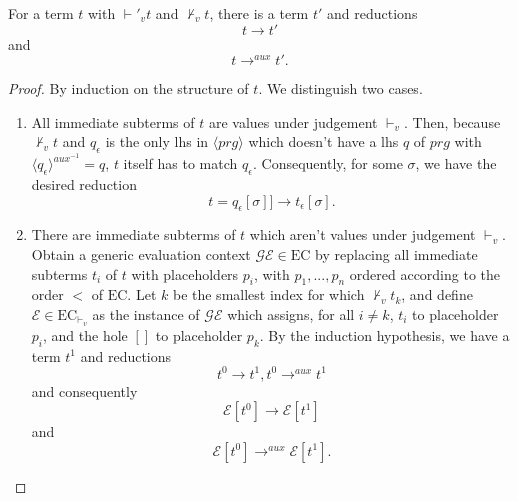 \begin{lemma}

For a term $t$ with $\vdash'_v t$ and $\not\vdash_v t$, there is a term $t'$ and reductions
\[
t \longrightarrow t'
\]
and
\[
t \longrightarrow^{aux} t'.
\]

\begin{proof}

By induction on the structure of $t$. We distinguish two cases.
\begin{enumerate}
\item All immediate subterms of $t$ are values under judgement $\vdash_v$. Then, because $\not\vdash_v t$ and $q_\epsilon$ is the only lhs in $\langle prg \rangle$ which doesn't have a lhs $q$ of $prg$ with $\langle q_\epsilon \rangle^{aux^{-1}} = q$, $t$ itself has to match $q_\epsilon$. Consequently, for some $\sigma$, we have the desired reduction
\[
t = q_\epsilon[\sigma]] \longrightarrow t_\epsilon[\sigma].
\]

\item There are immediate subterms of $t$ which aren't values under judgement $\vdash_v$. Obtain a generic evaluation context $\mathcal{GE} \in \textrm{EC}$ by replacing all immediate subterms $t_i$ of $t$ with placeholders $p_i$, with $p_1, ..., p_n$ ordered according to the order $<$ of $\textrm{EC}$. Let $k$ be the smallest index for which $\not\vdash_v t_k$, and define $\mathcal{E} \in \textrm{EC}_{\vdash_v}$ as the instance of $\mathcal{GE}$ which assigns, for all $i \neq k$, $t_i$ to placeholder $p_i$, and the hole $[]$ to placeholder $p_k$. By the induction hypothesis, we have a term $t^1$ and reductions
\[
t^0 \longrightarrow t^1, t^0 \longrightarrow^{aux} t^1
\]
and consequently
\[
\mathcal{E}[t^0] \longrightarrow \mathcal{E}[t^1]
\]
and
\[
\mathcal{E}[t^0] \longrightarrow^{aux} \mathcal{E}[t^1].
\]
\end{enumerate}

\end{proof}

\end{lemma}

